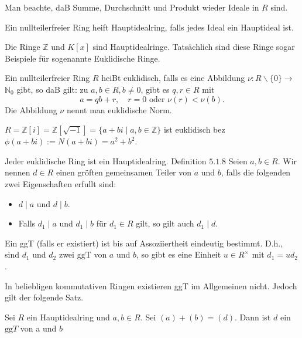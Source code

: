 Man beachte, daB Summe, Durchschnitt und Produkt wieder Ideale in $R$ sind.

\begin{definition}
    Ein nullteilerfreier Ring heift Hauptidealring, falls jedes Ideal ein Hauptideal ist.
\end{definition}

Die Ringe $\mathbb{Z}$ und $K[x]$ sind Hauptidealringe. Tatsächlich sind diese Ringe sogar Beispiele für sogenannte Euklidische Ringe.

\begin{definition}
    Ein nullteilerfreier Ring $R$ heiBt euklidisch, falls es eine Abbildung $\nu: R \backslash\{0\} \longrightarrow$ $\mathbb{N}_{0}$ gibt, so daB gilt: zu $a, b \in R, b \neq 0$, gibt es $q, r \in R$ mit
    $$
        a=q b+r, \quad r=0 \text { oder } \nu(r)<\nu(b) .
    $$
    Die Abbildung $\nu$ nennt man euklidische Norm.
\end{definition}
\begin{example}
    \(R=\mathbb{Z}[i]=\mathbb{Z}[\sqrt{-1}]=\{a+bi\mid a,b\in\mathbb{Z}\}\) ist euklidisch bez \(\phi(a+bi):=N(a+bi)=a^2+b^2\).
\end{example}

\begin{theorem}
    Jeder euklidische Ring ist ein Hauptidealring.
    Definition $5.1 .8$ Seien $a, b \in R .$ Wir nennen $d \in R$ einen gröften gemeinsamen Teiler von $a$ und $b$, falls die folgenden zwei Eigenschaften erfullt sind:
    \begin{itemize}
        \item $d \mid a$ und $d \mid b$.
        \item  Falls $d_{1} \mid a$ und $d_{1} \mid b$ für $d_{1} \in R$ gilt, so gilt auch $d_{1} \mid d$.
    \end{itemize}
\end{theorem}
\begin{remark}
    Ein ggT (falls er existiert) ist bis auf Assoziiertheit eindeutig bestimmt. D.h., sind $d_{1}$ und $d_{2}$ zwei $\mathrm{gg} \mathrm{T}$ von $a$ und $b$, so gibt es eine Einheit $u \in R^{\times}$ mit $d_{1}=u d_{2}$.
\end{remark}

In beliebligen kommutativen Ringen existieren ggT im Allgemeinen nicht. Jedoch gilt der folgende Satz.

\begin{theorem}
    Sei $R$ ein Hauptidealring und $a, b \in R .$ Sei $(a)+(b)=(d) .$ Dann ist $d$ ein $\mathrm{gg} T$ von a und $b$
\end{theorem}

